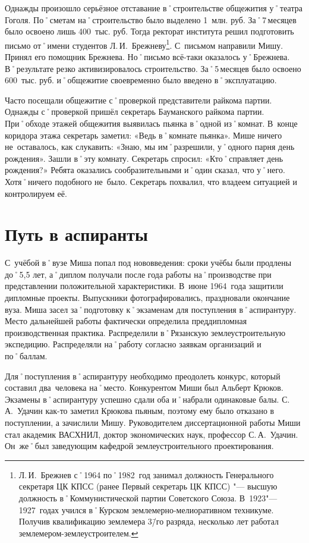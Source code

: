 Однажды произошло серьёзное отставание в˚строительстве общежития у˚театра Гоголя. По˚сметам на˚строительство было выделено 1~млн. руб. За˚7\,месяцев было освоено лишь 400~тыс. руб. Тогда ректорат института решил подготовить письмо от˚имени студентов Л.\,И.~Брежневу\footnote{Л.\,И.~Брежнев с˚1964 по˚1982~год занимал должность Генерального секретаря ЦК КПСС (ранее Первый секретарь ЦК КПСС) "--- высшую должность в˚Коммунистической партии Советского Союза. В~1923"---1927~годах учился в˚Курском землемерно-мелиоративном техникуме. Получив квалификацию землемера 3\=/го разряда, несколько лет работал землемером-землеустроителем.}. С~письмом направили Мишу. Принял его помощник Брежнева. Но˚письмо всё-таки оказалось у˚Брежнева. В˚результате резко активизировалось строительство. За˚5\,месяцев было освоено 600~тыс. руб. и˚общежитие своевременно было введено в˚эксплуатацию.

Часто посещали общежитие с˚проверкой представители райкома партии. Однажды с˚проверкой пришёл секретарь Бауманского райкома партии. При˚обходе этажей общежития выявилась пьянка в˚одной из˚комнат. В~конце коридора этажа секретарь заметил: «Ведь в˚комнате пьянка». Мише ничего не~оставалось, как слукавить: «Знаю, мы им˚разрешили, у˚одного парня день рождения». Зашли в˚эту комнату. Секретарь спросил: «Кто˚справляет день рождения?» Ребята оказались сообразительными и˚один сказал, что у˚него. Хотя˚ничего подобного не~было. Секретарь похвалил, что владеем ситуацией и контролируем её.

\clearpage 		%

\section*{Путь в аспиранты}
\label{sec:PathGraduateStudents}

С~учёбой в˚вузе Миша попал под нововведения: сроки учёбы были продлены до˚5,5 лет, а˚диплом получали после года работы на˚производстве при представлении положительной характеристики. В~июне 1964~года защитили дипломные проекты. Выпускники фотографировались, праздновали окончание вуза. Миша засел за˚подготовку к˚экзаменам для поступления в˚аспирантуру. Место дальнейшей работы фактически определила преддипломная производственная практика. Распределили в˚Рязанскую землеустроительную экспедицию. Распределяли на˚работу согласно заявкам организаций и по˚баллам.

Для˚поступления в˚аспирантуру необходимо преодолеть конкурс, который составил два~человека на˚место. Конкурентом Миши был Альберт Крюков. Экзамены в˚аспирантуру успешно сдали оба и˚набрали одинаковые балы. С.\,А.~Удачин как-то заметил Крюкова пьяным, поэтому ему было отказано в поступлении, а зачислили Мишу. Руководителем диссертационной работы Миши стал академик ВАСХНИЛ, доктор экономических наук, профессор С.\,А.~Удачин. Он~же˚был заведующим кафедрой землеустроительного проектирования.

